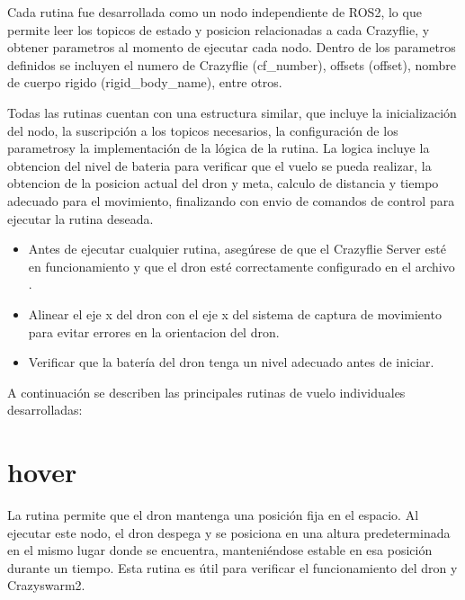 \documentclass[a4paper,11pt,spanish]{sphinxmanual}
\begin{document}
\sphinxAtStartPar
Cada rutina fue desarrollada como un nodo independiente de ROS2, lo que permite leer los topicos de estado y posicion relacionadas a cada Crazyflie, y obtener parametros al momento de ejecutar cada nodo. Dentro de los parametros definidos se incluyen el numero de Crazyflie (cf\_number), offsets (offset), nombre de cuerpo rigido (rigid\_body\_name), entre otros.

\sphinxAtStartPar
Todas las rutinas cuentan con una estructura similar, que incluye la inicialización del nodo, la suscripción a los topicos necesarios, la configuración de los parametrosy la implementación de la lógica de la rutina. La logica incluye la obtencion del nivel de bateria para verificar que el vuelo se pueda realizar, la obtencion de la posicion actual del dron y meta, calculo de distancia y tiempo adecuado para el movimiento, finalizando con envio de comandos de control para ejecutar la rutina deseada.

\sphinxAtStartPar
{}
\begin{itemize}
\item {} 
\sphinxAtStartPar
Antes de ejecutar cualquier rutina, asegúrese de que el Crazyflie Server esté en funcionamiento y que el dron esté correctamente configurado en el archivo .

\item {} 
\sphinxAtStartPar
Alinear el eje x del dron con el eje x del sistema de captura de movimiento para evitar errores en la orientacion del dron.

\item {} 
\sphinxAtStartPar
Verificar que la batería del dron tenga un nivel adecuado antes de iniciar.

\end{itemize}

\sphinxAtStartPar
A continuación se describen las principales rutinas de vuelo individuales desarrolladas:


\section{hover}
\label{\detokenize{rutinas_individuales:hover}}
\sphinxAtStartPar
La rutina  permite que el dron mantenga una posición fija en el espacio. Al ejecutar este nodo, el dron despega y se posiciona en una altura predeterminada en el mismo lugar donde se encuentra, manteniéndose estable en esa posición durante un tiempo. Esta rutina es útil para verificar el funcionamiento del dron y Crazyswarm2.
\end{document}
